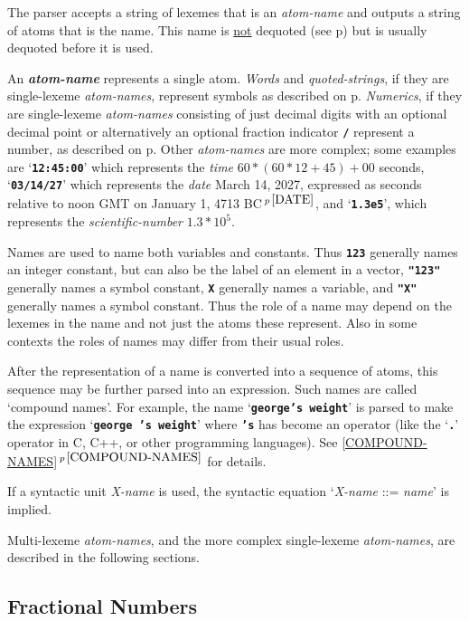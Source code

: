 \documentclass[12pt]{article}
\makeatletter
\newcommand{\TT}[1]{{\tt \bfseries #1}}
\newcommand{\emkey}[1]{{\bf \em #1}\index{#1@{\em #1}}}
\newcommand{\itemref}[1]{\ref{#1}$\,^{p\,\pageref{#1}}$}
\newcommand{\pagref}[1]{p\pageref{#1}}
\newcommand{\pagnote}[1]{$\,^{p\,\pageref{#1}}$}
\makeatother
\begin{document}
The parser accepts a string of lexemes that is an {\em atom-name}
and outputs a string of atoms that is the name.  This name is
\underline{not} dequoted (see \pagref{DEQUOTE}) but is usually
dequoted before it is used.

An \emkey{atom-name} represents a single atom.  {\em Words} and
{\em quoted-strings}, if they are single-lexeme {\em atom-names},
represent symbols as described on \pagref{SYMBOL}.
{\em Numerics}, if they are single-lexeme {\em atom-names}
consisting of just decimal digits with an optional decimal point or
alternatively an optional fraction indicator \TT{/} represent a number,
as described on \pagref{NUMBER}.
Other {\em atom-names} are more complex; some examples are
`\TT{12:45:00}' which represents the {\em time} $60*(60*12+45)+00$ seconds,
`\TT{03/14/27}' which represents the {\em date} March 14, 2027,
expressed as seconds relative to
noon GMT on January 1, 4713 BC\pagnote{DATE},
and `\TT{1.3e5}', which represents the {\em scientific-number}
$1.3*10^{5}$.

Names are used to name both variables and constants.  Thus \TT{123}
generally names an integer constant, but can also be the label of
an element in a vector, \TT{"123"} generally names a symbol constant, \TT{X}
generally names a variable, and \TT{"X"} generally names a symbol constant.
Thus the role of a name may depend on the lexemes in the name and not
just the atoms these represent.  Also in some contexts the roles of
names may differ from their usual roles.

After the representation of a name is converted into a sequence
of atoms, this sequence may be further parsed into an expression.
Such names are called `compound names'.  For example, the name
`\TT{george's weight}' is parsed to make the expression
`\TT{george 's weight}' where \TT{'s} has become an operator
(like the `\TT{.}' operator in C, C++, or other programming languages).
See \itemref{COMPOUND-NAMES} for details.

If a syntactic unit {\em X-name} is used, the syntactic equation
`{\em X-name} ::= {\em name}' is implied.

Multi-lexeme {\em atom-names}, and the more complex single-lexeme
{\em atom-names}, are described in the following sections.

\subsection{Fractional Numbers}
\label{FRACTIONAL-NUMBER}
\end{document}
